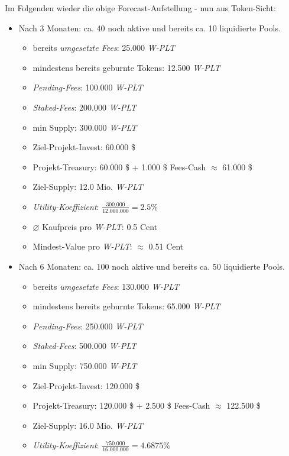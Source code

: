 \begin{Example}
\vspace{1.0cm}

Im Folgenden wieder die obige Forecast-Aufstellung - nun aus Token-Sicht:


\begin{itemize}
	\item Nach 3 Monaten: ca. 40 noch aktive und bereits ca. 10 liquidierte Pools.
	\begin{itemize}
		\item bereits \textit{umgesetzte Fees}: 25.000 \textit{W-PLT} 
		\item mindestens bereits geburnte Tokens: 12.500 \textit{W-PLT} 
		\item \textit{Pending-Fees}: 100.000 \textit{W-PLT}  
		\item \textit{Staked-Fees}: 200.000 \textit{W-PLT}
		\item min Supply: 300.000 \textit{W-PLT}
		\item Ziel-Projekt-Invest: 60.000 \$ 
		\item Projekt-Treasury: 60.000 \$ + 1.000 \$ Fees-Cash $\approx$ 61.000 \$
		\item Ziel-Supply: 12.0 Mio. \textit{W-PLT}
		\item \textit{Utility-Koeffizient}: $\frac{300.000}{12.000.000} = 2.5 \%$
		\item $\varnothing$ Kaufpreis pro \textit{W-PLT}: 0.5 Cent
		\item Mindest-Value pro \textit{W-PLT}: $\approx$ 0.51 Cent
	\end{itemize}
	\item Nach 6 Monaten: ca. 100 noch aktive und bereits ca. 50 liquidierte Pools.
	\begin{itemize}
		\item bereits \textit{umgesetzte Fees}: 130.000 \textit{W-PLT}
		\item mindestens bereits geburnte Tokens: 65.000 \textit{W-PLT}  
		\item \textit{Pending-Fees}: 250.000 \textit{W-PLT}
		\item \textit{Staked-Fees}: 500.000 \textit{W-PLT} 
		\item min Supply: 750.000 \textit{W-PLT}
		\item Ziel-Projekt-Invest: 120.000 \$
		\item Projekt-Treasury: 120.000 \$ + 2.500 \$ Fees-Cash $\approx$ 122.500 \$
		\item Ziel-Supply: 16.0 Mio. \textit{W-PLT}
		\item \textit{Utility-Koeffizient}: $\frac{750.000}{16.000.000} = 4.6875 \%$

\end{itemize}
\end{itemize}
\end{Example}
